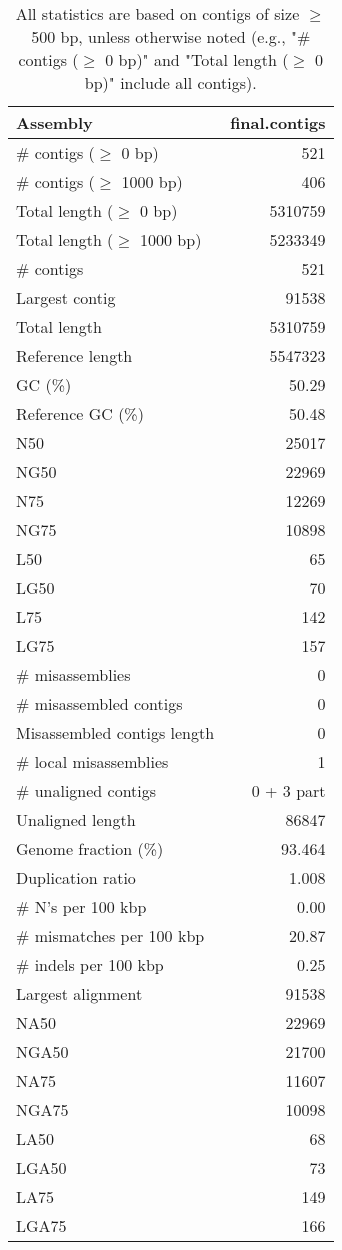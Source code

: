 \documentclass[12pt,a4paper]{article}
\begin{document}
\begin{table}[ht]
\begin{center}
\caption{All statistics are based on contigs of size $\geq$ 500 bp, unless otherwise noted (e.g., "\# contigs ($\geq$ 0 bp)" and "Total length ($\geq$ 0 bp)" include all contigs).}
\begin{tabular}{|l*{1}{|r}|}
\hline
Assembly & final.contigs \\ \hline
\# contigs ($\geq$ 0 bp) & 521 \\ \hline
\# contigs ($\geq$ 1000 bp) & 406 \\ \hline
Total length ($\geq$ 0 bp) & 5310759 \\ \hline
Total length ($\geq$ 1000 bp) & 5233349 \\ \hline
\# contigs & 521 \\ \hline
Largest contig & 91538 \\ \hline
Total length & 5310759 \\ \hline
Reference length & 5547323 \\ \hline
GC (\%) & 50.29 \\ \hline
Reference GC (\%) & 50.48 \\ \hline
N50 & 25017 \\ \hline
NG50 & 22969 \\ \hline
N75 & 12269 \\ \hline
NG75 & 10898 \\ \hline
L50 & 65 \\ \hline
LG50 & 70 \\ \hline
L75 & 142 \\ \hline
LG75 & 157 \\ \hline
\# misassemblies & 0 \\ \hline
\# misassembled contigs & 0 \\ \hline
Misassembled contigs length & 0 \\ \hline
\# local misassemblies & 1 \\ \hline
\# unaligned contigs & 0 + 3 part \\ \hline
Unaligned length & 86847 \\ \hline
Genome fraction (\%) & 93.464 \\ \hline
Duplication ratio & 1.008 \\ \hline
\# N's per 100 kbp & 0.00 \\ \hline
\# mismatches per 100 kbp & 20.87 \\ \hline
\# indels per 100 kbp & 0.25 \\ \hline
Largest alignment & 91538 \\ \hline
NA50 & 22969 \\ \hline
NGA50 & 21700 \\ \hline
NA75 & 11607 \\ \hline
NGA75 & 10098 \\ \hline
LA50 & 68 \\ \hline
LGA50 & 73 \\ \hline
LA75 & 149 \\ \hline
LGA75 & 166 \\ \hline
\end{tabular}
\end{center}
\end{table}
\end{document}
